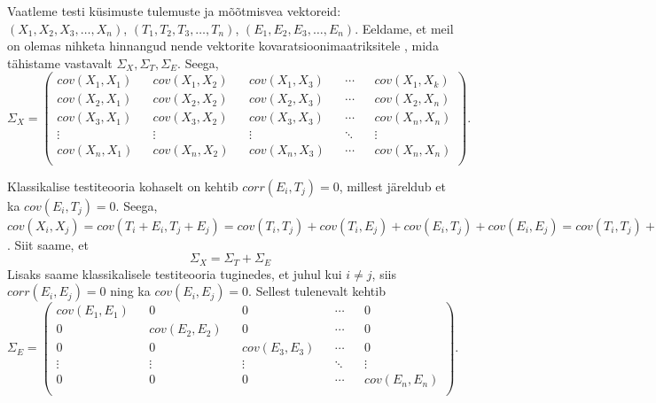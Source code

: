 \documentclass[a4paper,12pt]{article}
\numberwithin{equation}{section}
\theoremstyle{definition}
\begin{document}
Vaatleme testi k\"usimuste tulemuste ja mõõtmisvea vektoreid: $\left( X_1, X_2, X_3, \ldots, X_n \right)$, $\left( T_1, T_2, T_3, \ldots, T_n \right)$, $\left( E_1, E_2, E_3, \ldots, E_n \right)$. Eeldame, et meil on olemas nihketa hinnangud nende vektorite kovaratsioonimaatriksitele , mida tähistame vastavalt $\Sigma_X, \Sigma_T, \Sigma_E$. Seega, 
\begin{equation*}
\Sigma_X = 
\begin{pmatrix}
cov \left(X_1,X_1 \right) && cov\left( X_1,X_2 \right) && cov \left( X_1,X_3 \right) && \cdots && cov \left( X_1,X_k \right) \\
cov \left(X_2, X_1 \right) && cov \left(X_2, X_2 \right) && cov \left(X_2, X_3 \right) && \cdots && cov \left(X_2, X_n \right) \\
cov \left(X_3, X_1 \right) && cov \left(X_3, X_2 \right) && cov \left(X_3, X_3 \right) && \cdots && cov \left(X_n, X_n \right) \\
\vdots && \vdots && \vdots && \ddots && \vdots \\
cov \left(X_n, X_1 \right) && cov \left(X_n, X_2 \right) && cov \left(X_n, X_3 \right) && \cdots && cov \left(X_n, X_n \right) \\
\end{pmatrix}.
\end{equation*}

Klassikalise testiteooria kohaselt on kehtib $corr \left( E_i, T_j \right) = 0 $, millest järeldub et ka $cov \left( E_i, T_j \right) =0$. 
Seega, $cov \left( X_i, X_j \right) = cov \left( T_i + E_i, T_j + E_j \right) = cov \left( T_i,T_j \right) + cov \left( T_i,E_j \right) + cov \left( E_i,T_j \right)+ cov \left( E_i, E_j \right) = cov \left( T_i,T_j \right) + cov \left(E_i,E_j \right)$. Siit saame, et 
\begin{equation}
\label{eq:sigma_x_=_sigma_t_+_sigma_e}
\Sigma_X = \Sigma_T + \Sigma_E
\end{equation}
Lisaks saame klassikalisele testiteooria tuginedes, et juhul kui $i \neq j$, siis $corr \left( E_i, E_j \right) = 0$ ning ka $cov \left( E_i, E_j \right) = 0$.
Sellest tulenevalt kehtib
\begin{equation}
\Sigma_E = 
\begin{pmatrix}
cov \left(E_1,E_1 \right) && 0 && 0 && \cdots && 0 \\
0 && cov \left(E_2, E_2 \right) && 0 && \cdots && 0 \\
0 && 0 && cov \left(E_3, E_3 \right) && \cdots && 0 \\
\vdots && \vdots && \vdots && \ddots && \vdots \\
0 && 0 &&  0 && \cdots && cov \left(E_n, E_n \right) \\
\end{pmatrix}.
\end{equation}
\end{document}
